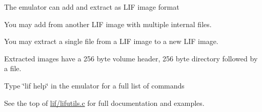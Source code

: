 \begin{DoxyItemize}
\begin{DoxyItemize}
\begin{DoxyItemize}
\item The emulator can add and extract as L\+IF image format
\begin{DoxyItemize}
\item You may add from another L\+IF image with multiple internal files.
\item You may extract a single file from a L\+IF image to a new L\+IF image.
\item Extracted images have a 256 byte volume header, 256 byte directory followed by a file.
\end{DoxyItemize}
\item Type \char`\"{}lif help\char`\"{} in the emulator for a full list of commands
\begin{DoxyItemize}
\item See the top of \hyperlink{lifutils_8c}{lif/lifutils.\+c} for full documentation and examples. 


\end{DoxyItemize}
\end{DoxyItemize}
\end{DoxyItemize}
\end{DoxyItemize}
